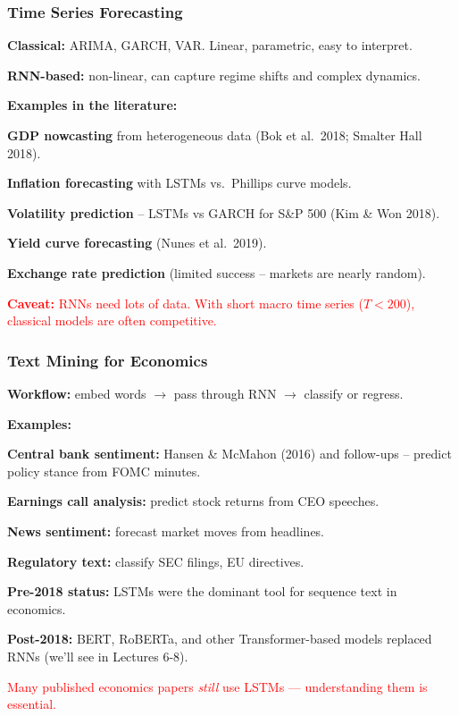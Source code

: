\documentclass[notes,11pt, aspectratio=169]{beamer}
\newenvironment{wideitemize}{\itemize\addtolength{\itemsep}{10pt}}{\enditemize}
\begin{document}
\begin{frame}
\frametitle{Time Series Forecasting}

\textbf{Classical:} ARIMA, GARCH, VAR. Linear, parametric, easy to interpret.

\vspace{4pt}
\textbf{RNN-based:} non-linear, can capture regime shifts and complex dynamics.

\vspace{8pt}
\textbf{Examples in the literature:}
\begin{wideitemize}
    \item \textbf{GDP nowcasting} from heterogeneous data (Bok et al.\ 2018; Smalter Hall 2018).
    \item \textbf{Inflation forecasting} with LSTMs vs.\ Phillips curve models.
    \item \textbf{Volatility prediction} -- LSTMs vs GARCH for S\&P 500 (Kim \& Won 2018).
    \item \textbf{Yield curve forecasting} (Nunes et al.\ 2019).
    \item \textbf{Exchange rate prediction} (limited success -- markets are nearly random).
\end{wideitemize}

\vspace{8pt}
\textcolor{red}{\textbf{Caveat:} RNNs need lots of data. With short macro time series ($T < 200$), classical models are often competitive.}
\end{frame}

\begin{frame}
\frametitle{Text Mining for Economics}

\textbf{Workflow:} embed words $\to$ pass through RNN $\to$ classify or regress.

\vspace{6pt}
\textbf{Examples:}
\begin{wideitemize}
    \item \textbf{Central bank sentiment:} Hansen \& McMahon (2016) and follow-ups -- predict policy stance from FOMC minutes.
    \item \textbf{Earnings call analysis:} predict stock returns from CEO speeches.
    \item \textbf{News sentiment:} forecast market moves from headlines.
    \item \textbf{Regulatory text:} classify SEC filings, EU directives.
\end{wideitemize}

\vspace{8pt}
\textbf{Pre-2018 status:} LSTMs were the dominant tool for sequence text in economics.

\textbf{Post-2018:} BERT, RoBERTa, and other Transformer-based models replaced RNNs (we'll see in Lectures 6-8).

\vspace{4pt}
\textcolor{red}{Many published economics papers \emph{still} use LSTMs --- understanding them is essential.}
\end{frame}
\end{document}
